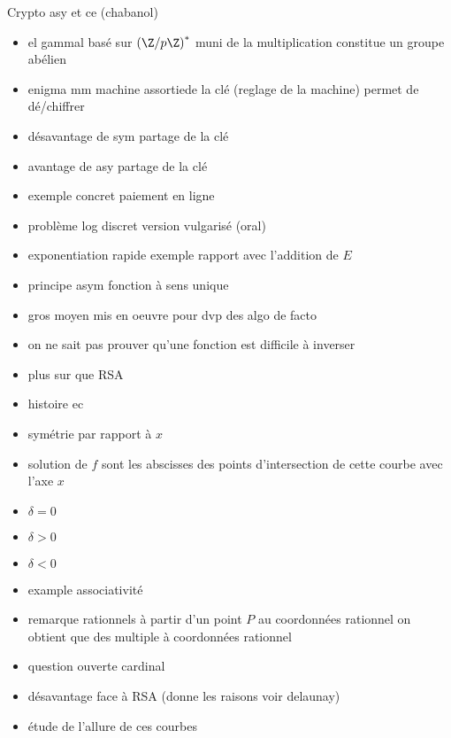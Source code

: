 Crypto asy et ce (chabanol)
\begin{itemize}
    \item el gammal basé sur $\left( \Z / p\Z \right) ^{*}$ muni de la multiplication
        constitue un groupe abélien
    \item enigma mm machine assortiede la clé (reglage de la machine) permet de dé/chiffrer
    \item désavantage de sym partage de la clé
    \item avantage de asy partage de la clé
    \item exemple concret paiement en ligne
    \item problème log discret version vulgarisé (oral)
    \item exponentiation rapide exemple rapport avec l'addition de $E$
    \item principe asym fonction à sens unique
    \item gros moyen mis en oeuvre pour dvp des algo de facto
    \item on ne sait pas prouver qu'une fonction est difficile à inverser
    \item plus sur que RSA
    \item histoire ec
    \item symétrie par rapport à $x$ 
    \item solution de $f$ sont les abscisses des points d'intersection de cette courbe
        avec l'axe $x$
    \item $\delta = 0$
    \item  $\delta > 0$ 
    \item $\delta < 0$
    \item example associativité
    \item remarque rationnels à partir d'un point $P$ au coordonnées rationnel on obtient
        que des multiple à coordonnées rationnel
    \item question ouverte cardinal
    \item désavantage face à RSA (donne les raisons voir delaunay)
    \item étude de l'allure de ces courbes
\end{itemize}

